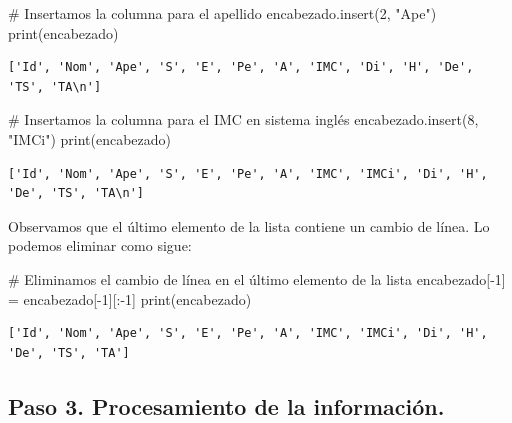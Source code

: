 \documentclass[
  spanish,
  letterpaper,
]{scrbook}
\newenvironment{Shaded}{\begin{snugshade}}{\end{snugshade}}
\newcommand{\BuiltInTok}[1]{\textcolor[rgb]{0.00,0.23,0.31}{#1}}
\newcommand{\CommentTok}[1]{\textcolor[rgb]{0.37,0.37,0.37}{#1}}
\newcommand{\DecValTok}[1]{\textcolor[rgb]{0.68,0.00,0.00}{#1}}
\newcommand{\NormalTok}[1]{\textcolor[rgb]{0.00,0.23,0.31}{#1}}
\newcommand{\OperatorTok}[1]{\textcolor[rgb]{0.37,0.37,0.37}{#1}}
\newcommand{\StringTok}[1]{\textcolor[rgb]{0.13,0.47,0.30}{#1}}
\theoremstyle{definition}
\theoremstyle{remark}
\begin{document}
\begin{Shaded}
\begin{Highlighting}[]
\CommentTok{\# Insertamos la columna para el apellido}
\NormalTok{encabezado.insert(}\DecValTok{2}\NormalTok{, }\StringTok{"Ape"}\NormalTok{)}
\BuiltInTok{print}\NormalTok{(encabezado)}
\end{Highlighting}
\end{Shaded}

\begin{verbatim}
['Id', 'Nom', 'Ape', 'S', 'E', 'Pe', 'A', 'IMC', 'Di', 'H', 'De', 'TS', 'TA\n']
\end{verbatim}

\begin{Shaded}
\begin{Highlighting}[]
\CommentTok{\# Insertamos la columna para el IMC en sistema inglés}
\NormalTok{encabezado.insert(}\DecValTok{8}\NormalTok{, }\StringTok{"IMCi"}\NormalTok{)}
\BuiltInTok{print}\NormalTok{(encabezado)}
\end{Highlighting}
\end{Shaded}

\begin{verbatim}
['Id', 'Nom', 'Ape', 'S', 'E', 'Pe', 'A', 'IMC', 'IMCi', 'Di', 'H', 'De', 'TS', 'TA\n']
\end{verbatim}

Observamos que el último elemento de la lista contiene un cambio de
línea. Lo podemos eliminar como sigue:

\begin{Shaded}
\begin{Highlighting}[]
\CommentTok{\# Eliminamos el cambio de línea en el último elemento de la lista}
\NormalTok{encabezado[}\OperatorTok{{-}}\DecValTok{1}\NormalTok{] }\OperatorTok{=}\NormalTok{ encabezado[}\OperatorTok{{-}}\DecValTok{1}\NormalTok{][:}\OperatorTok{{-}}\DecValTok{1}\NormalTok{]}
\BuiltInTok{print}\NormalTok{(encabezado)}
\end{Highlighting}
\end{Shaded}

\begin{verbatim}
['Id', 'Nom', 'Ape', 'S', 'E', 'Pe', 'A', 'IMC', 'IMCi', 'Di', 'H', 'De', 'TS', 'TA']
\end{verbatim}

\subsection{Paso 3. Procesamiento de la
información.}\label{paso-3.-procesamiento-de-la-informaciuxf3n.}
\end{document}
